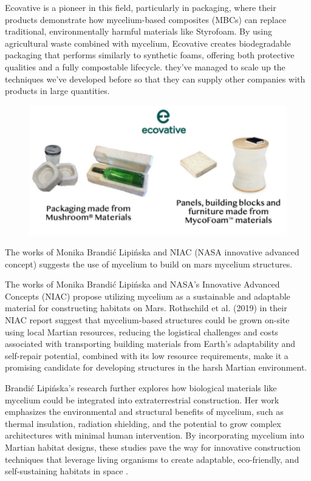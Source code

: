 Ecovative is a pioneer in this field, particularly in packaging, where their products demonstrate how mycelium-based composites (MBCs) can replace traditional, environmentally harmful materials like Styrofoam. By using agricultural waste combined with mycelium, Ecovative creates biodegradable packaging that performs similarly to synthetic foams, offering both protective qualities and a fully compostable lifecycle. they've managed to scale up the techniques we've developed before so that they can supply other companies with products in large quantities. 
\begin{figure}[h]
    \centering
    \includegraphics{images/ecovative.png}
    \caption{}
    \label{fig:ecovative}
\end{figure} 

The works of Monika Brandić Lipińska and NIAC (NASA innovative advanced concept) suggests the use of mycelium\cite{rothschild2019myco} to build on mars mycelium structures\cite{brandic2022biological}.

The works of Monika Brandić Lipińska and NASA’s Innovative Advanced Concepts (NIAC) propose utilizing mycelium as a sustainable and adaptable material for constructing habitats on Mars. Rothschild et al. (2019) \cite{rothschild2019myco} in their NIAC report suggest that mycelium-based structures could be grown on-site using local Martian resources, reducing the logistical challenges and costs associated with transporting building materials from Earth’s adaptability and self-repair potential, combined with its low resource requirements, make it a promising candidate for developing structures in the harsh Martian environment.

Brandić Lipińska’s research\cite{brandic2022biological} further explores how biological materials like mycelium could be integrated into extraterrestrial construction. Her work emphasizes the environmental and structural benefits of mycelium, such as thermal insulation, radiation shielding, and the potential to grow complex architectures with minimal human intervention. By incorporating mycelium into Martian habitat designs, these studies pave the way for innovative construction techniques that leverage living organisms to create adaptable, eco-friendly, and self-sustaining habitats in space .

